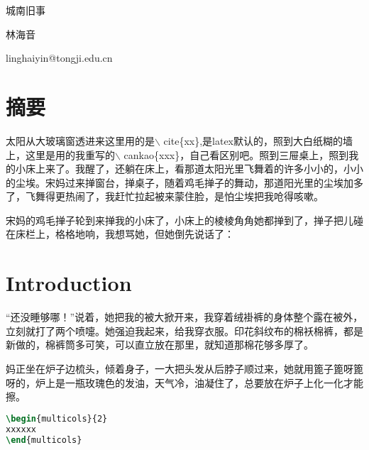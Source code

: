 \documentclass[a4paper,12pt]{article}
\begin{document}

\yemeiclean  %

\begin{center}
\sihao    城南旧事
\wuhao

林海音

linghaiyin@tongji.edu.cn

\end{center}
\begin{multicols}{2}


\section*{\hfill 摘要 \hfill}
太阳从大玻璃窗透进来\cite{CK1}这里用的是$\backslash$ cite\{xx\},是latex默认的，照到大白纸糊的墙上，这里是用的我重写的$\backslash$ cankao\{xxx\}，自己看区别吧。照到三屉桌上，照到我的小床上来了。我醒了，还躺在床上，看那道太阳光里飞舞着的许多小小的，小小的尘埃。宋妈过来掸窗台，掸桌子，随着鸡毛掸子的舞动，那道阳光里的尘埃加多了，飞舞得更热闹了，我赶忙拉起被来蒙住脸，是怕尘埃把我呛得咳嗽。

宋妈的鸡毛掸子轮到来掸我的小床了，小床上的棱棱角角她都掸到了，掸子把儿碰在床栏上，格格地响，我想骂她，但她倒先说话了：


\section{Introduction}

“还没睡够哪！”说着，她把我的被大掀开来，我穿着绒褂裤的身体整个露在被外，立刻就打了两个喷嚏。她强迫我起来，给我穿衣服。印花斜纹布的棉袄棉裤，都是新做的，棉裤筒多可笑，可以直立放在那里，就知道那棉花够多厚了。

妈正坐在炉子边梳头，倾着身子，一大把头发从后脖子顺过来，她就用篦子篦呀篦呀的，炉上是一瓶玫瑰色的发油，天气冷，油凝住了，总要放在炉子上化一化才能擦。


\begin{lstlisting}[language=TeX,numbers=none,frame=lrtb,keywords={begin},label=lstlisting,caption=多栏]
\begin{multicols}{2}
xxxxxx
\end{multicols}
\end{lstlisting}

\end{multicols}
\end{document}
